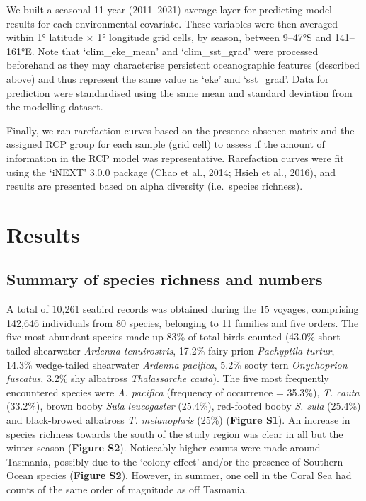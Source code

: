 \documentclass{article}
\begin{document}
\begin{linenumbers}
We built a seasonal 11-year (2011--2021) average layer for predicting model results for each environmental covariate. These variables were then averaged within 1° latitude \(\times\) 1° longitude grid cells, by season, between 9--47°S and 141--161°E. Note that `clim\_eke\_mean' and `clim\_sst\_grad' were processed beforehand as they may characterise persistent oceanographic features (described above) and thus represent the same value as `eke' and `sst\_grad'. Data for prediction were standardised using the same mean and standard deviation from the modelling dataset.

Finally, we ran rarefaction curves based on the presence-absence matrix and the assigned RCP group for each sample (grid cell) to assess if the amount of information in the RCP model was representative. Rarefaction curves were fit using the `iNEXT' 3.0.0 package (Chao et al., 2014; Hsieh et al., 2016), and results are presented based on alpha diversity (i.e.~species richness).

\hypertarget{results}{%
\section{Results}\label{results}}

\hypertarget{summary-of-species-richness-and-numbers}{%
\subsection{Summary of species richness and numbers}\label{summary-of-species-richness-and-numbers}}

A total of 10,261 seabird records was obtained during the 15 voyages, comprising 142,646 individuals from 80 species, belonging to 11 families and five orders. The five most abundant species made up 83\% of total birds counted (43.0\% short-tailed shearwater \emph{Ardenna tenuirostris}, 17.2\% fairy prion \emph{Pachyptila turtur}, 14.3\% wedge-tailed shearwater \emph{Ardenna pacifica}, 5.2\% sooty tern \emph{Onychoprion fuscatus}, 3.2\% shy albatross \emph{Thalassarche cauta}). The five most frequently encountered species were \emph{A. pacifica} (frequency of occurrence = 35.3\%), \emph{T. cauta} (33.2\%), brown booby \emph{Sula leucogaster} (25.4\%), red-footed booby \emph{S. sula} (25.4\%) and black-browed albatross \emph{T. melanophris} (25\%) (\textbf{Figure S1}). An increase in species richness towards the south of the study region was clear in all but the winter season (\textbf{Figure S2}). Noticeably higher counts were made around Tasmania, possibly due to the `colony effect' and/or the presence of Southern Ocean species (\textbf{Figure S2}). However, in summer, one cell in the Coral Sea had counts of the same order of magnitude as off Tasmania.


\end{linenumbers}
\end{document}
